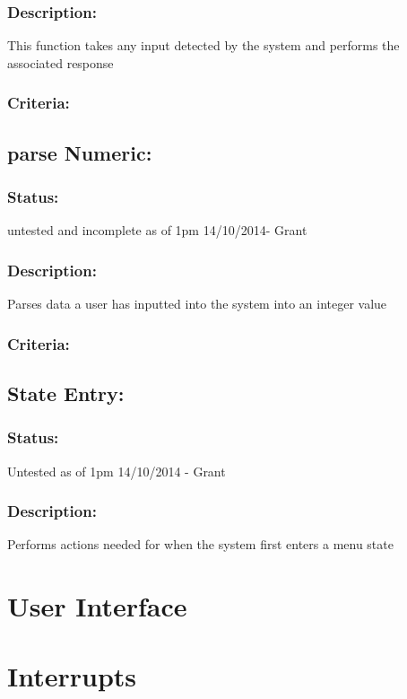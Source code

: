 \documentclass[]{report}
\begin{document}
\subsubsection{Description:}
This function takes any input detected by the system and performs the associated response

\subsubsection{Criteria:}

\subsection{parse Numeric:}
\subsubsection{Status:}
untested and incomplete as of 1pm 14/10/2014- Grant

\subsubsection{Description:}
Parses data a user has inputted into the system into an integer value

\subsubsection{Criteria:}

\subsection{State Entry:}
\subsubsection{Status:}
Untested as of 1pm 14/10/2014 - Grant

\subsubsection{Description:}
Performs actions needed for when the system first enters a menu state


\newpage
\section{User Interface}


\newpage
\section{Interrupts}
\end{document}
